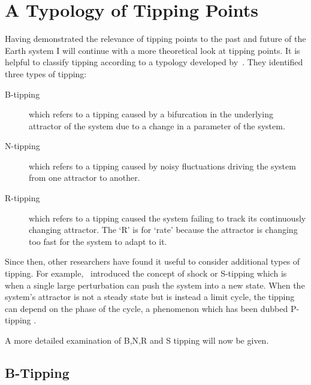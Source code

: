 \section{A Typology of Tipping Points}
\label{sec:tipping_typology}
Having demonstrated the relevance of tipping points to the past and future of the Earth system I will continue with a more theoretical look at tipping points. It is helpful
to classify tipping according to a typology developed by~\cite{Ashwin2012}. They identified three types of tipping:
\begin{description}
\item[B-tipping] which refers to a tipping caused by a bifurcation in the underlying attractor of the system due to a change in a parameter of the system.
\item[N-tipping] which refers to a tipping caused by noisy fluctuations driving the system  from one attractor to another.
\item[R-tipping] which  refers to a tipping caused the system failing to track its continuously changing attractor. The `R' is for `rate' because the attractor is changing too
  fast for the system to adapt to it.
\end{description}

Since then, other researchers have found it useful to consider additional types of tipping. For example,~\cite{Halekotte2020} introduced the concept of shock or S-tipping which is when a single large perturbation
can push the system into a new state. When the system's attractor is not a steady state but is instead a limit cycle, the tipping can depend on the phase of the cycle, a phenomenon which has
been dubbed P-tipping \parencite{Alkhayuon2021}. 

A more detailed examination of B,N,R and S tipping will now be given.

\subsection{B-Tipping}
\label{sec:btipping}

